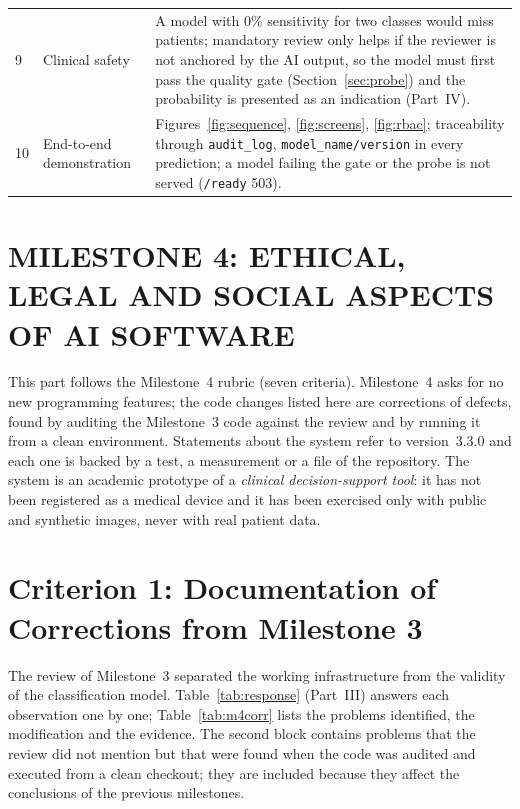 \documentclass[12pt,a4paper]{article}
\begin{document}
\begin{table}[H]
\begin{tabularx}{\textwidth}{C{0.6cm} L{4.2cm} Y}
9 & Clinical safety & A model with 0\% sensitivity for two classes would miss patients; mandatory review only helps if the reviewer is not anchored by the AI output, so the model must first pass the quality gate (Section~\ref{sec:probe}) and the probability is presented as an indication (Part~IV). \\
10 & End-to-end demonstration & Figures~\ref{fig:sequence}, \ref{fig:screens}, \ref{fig:rbac}; traceability through \texttt{audit\_log}, \texttt{model\_name/version} in every prediction; a model failing the gate or the probe is not served (\texttt{/ready} 503). \\
\end{tabularx}
\end{table}

\newpage
\section*{MILESTONE 4: ETHICAL, LEGAL AND SOCIAL ASPECTS OF AI SOFTWARE}

This part follows the Milestone~4 rubric (seven criteria). Milestone~4 asks for no new programming features; the code changes listed here are
corrections of defects, found by auditing the Milestone~3 code against the review and by running it from a clean environment. Statements about the
system refer to version~3.3.0 and each one is backed by a test, a measurement or a file of the repository. The system is an academic prototype of a
\emph{clinical decision-support tool}: it has not been registered as a medical device and it has been exercised only with public and synthetic images, never with real patient data.

\section{Criterion 1: Documentation of Corrections from Milestone 3}
\label{sec:m4c1}

The review of Milestone~3 separated the working infrastructure from the validity of the classification model. Table~\ref{tab:response} (Part~III) answers each
observation one by one; Table~\ref{tab:m4corr} lists the problems identified, the modification and the evidence. The second block contains problems that the
review did not mention but that were found when the code was audited and executed from a clean checkout; they are included because they affect the conclusions of the previous milestones.
\end{document}
